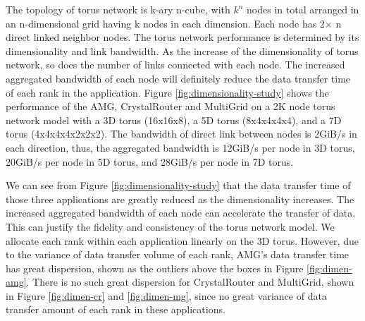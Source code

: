 \documentclass[conference]{IEEEtran}
\begin{document}
The topology of torus network is k-ary n-cube, with $k^n$ nodes in total arranged in an n-dimensional grid having k nodes in each dimension. Each node has 2$\times$ n direct linked neighbor nodes. The torus network performance is determined by its dimensionality and link bandwidth. As the increase of the dimensionality of torus network, so does the number of links connected with each node. The increased aggregated bandwidth of each node will definitely reduce the data transfer time of each rank in the application. Figure \ref{fig:dimensionality-study} shows the performance of the AMG, CrystalRouter and MultiGrid on a 2K node torus network model with a 3D torus (16x16x8), a 5D torus (8x4x4x4x4), and a 7D torus (4x4x4x4x2x2x2). The bandwidth of direct link between nodes is 2GiB/s in each direction, thus, the aggregated bandwidth is 12GiB/s per node in 3D torus, 20GiB/s per node in 5D torus, and 28GiB/s per node in 7D torus.

 
We can see from Figure \ref{fig:dimensionality-study} that the data transfer time of those three applications are greatly reduced as the dimensionality increases. The increased aggregated bandwidth of each node can accelerate the transfer of data. This can justify the fidelity and consistency of the torus network model. We allocate each rank within each application linearly on the 3D torus. However, due to the variance of data transfer volume of each rank, AMG's data transfer time has great dispersion, shown as the outliers above the boxes in Figure \ref{fig:dimen-amg}. There is no such great dispersion for CrystalRouter and MultiGrid, shown in Figure \ref{fig:dimen-cr} and \ref{fig:dimen-mg}, since no great variance of data transfer amount of each rank in these applications.
\end{document}
